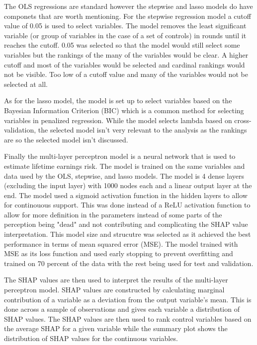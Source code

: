 \documentclass[12pt]{article}
\begin{document}
\begin{onehalfspace}
The OLS regressions are standard however the stepwise and lasso models do have componets that are worth mentioning. For the stepwise regression model a cutoff value of 0.05 is used to select variables. The model removes the least significant variable (or group of variables in the case of a set of controls) in rounds until it reaches the cutoff. 0.05 was selected so that the model would still select some variables but the rankings of the many of the variables would be clear. A higher cutoff and most of the variables would be selected and cardinal rankings would not be visible. Too low of a cutoff value and many of the variables would not be selected at all. 

As for the lasso model, the model is set up to select variables based on the Bayesian Information Criterion (BIC) which is a common method for selecting variables in penalized regression. While the model selects lambda based on cross-validation, the selected model isn't very relevant to the analysis as the rankings are so the selected model isn't discussed.

Finally the multi-layer perceptron model is a neural network that is used to estimate lifetime earnings risk. The model is trained on the same variables and data used by the OLS, stepwise, and lasso models. The model is 4 dense layers (excluding the input layer) with 1000 nodes each and a linear output layer at the end. The model used a sigmoid activation function in the hidden layers to allow for continouous support. This was done instead of a ReLU activation function to allow for more definition in the parameters instead of some parts of the perception being "dead" and not contributing and complicating the SHAP value interpretation. This model size and strucutre was selected as it achieved the best performance in terms of mean squared error (MSE). The model trained with MSE as its loss function and used early stopping to prevent overfitting and trained on 70 percent of the data with the rest being used for test and validation.

The SHAP values are then used to interpret the results of the multi-layer perceptron model. SHAP values are constructed by calculating marginal contribution of a variable as a deviation from the output variable's mean. This is done across a sample of observations and gives each variable a distribution of SHAP values. The SHAP values are then used to rank control variables based on the average SHAP for a given variable while the summary plot shows the distribution of SHAP values for the continuous variables. 




\end{onehalfspace}
\end{document}
